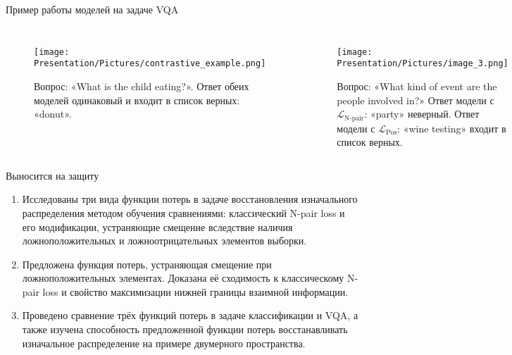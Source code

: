 \documentclass{beamer}
\begin{document}
\begin{frame}{Пример работы моделей на задаче VQA}

\begin{columns}
\begin{figure}
    \centering
    \texttt{[image: Presentation/Pictures/contrastive\_example.png]}
    \caption{Вопрос: «What is the child eating?». Ответ обеих моделей одинаковый и входит в список верных: «donut».}
\end{figure}

\begin{figure}
    \centering
    \texttt{[image: Presentation/Pictures/image\_3.png]}
    \caption{Вопрос: «What kind of event are the people involved in?» Ответ модели с $\mathcal{L}_{\text{N-pair}}$: «party» неверный. Ответ модели с $\mathcal{L}_{\text{Pos}}$: «wine testing» входит в список верных.}
\end{figure}
\end{columns}

\end{frame}
\begin{frame}{Выносится на защиту}
\small
\begin{enumerate}
    \item Исследованы три вида функции потерь в задаче восстановления изначального распределения методом обучения сравнениями: классический N-pair loss и его модификации, устраняющие смещение вследствие наличия ложноположительных и ложноотрицательных элементов выборки.
    \item Предложена функция потерь, устраняющая смещение при ложноположительных элементах. Доказана её сходимость к классическому N-pair loss и свойство максимизации нижней границы взаимной информации.
    \item Проведено сравнение трёх функций потерь в задаче классификации и VQA, а также изучена способность предложенной функции потерь восстанавливать изначальное распределение на примере двумерного пространства.
\end{enumerate}
\end{frame}
    
\end{document}
